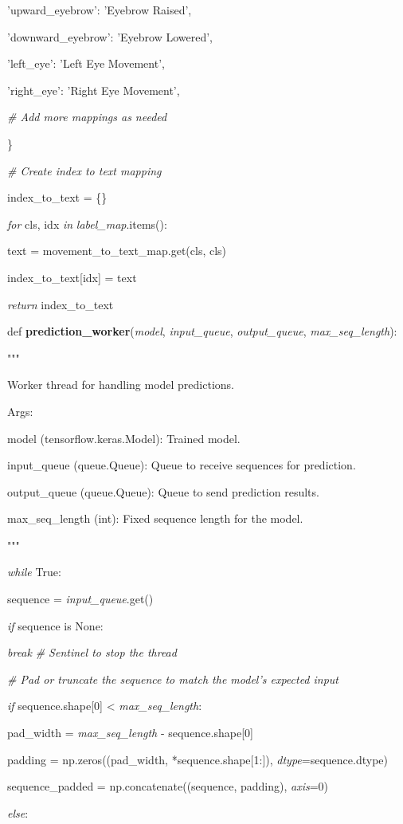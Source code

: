\documentclass[
]{article}
\begin{document}
'upward\_eyebrow': 'Eyebrow Raised',

'downward\_eyebrow': 'Eyebrow Lowered',

'left\_eye': 'Left Eye Movement',

'right\_eye': 'Right Eye Movement',

\emph{\# Add more mappings as needed}

\}

\emph{\# Create index to text mapping}

index\_to\_text = \{\}

\emph{for} cls, idx \emph{in} \emph{label\_map}.items():

text = movement\_to\_text\_map.get(cls, cls)

index\_to\_text{[}idx{]} = text

\emph{return} index\_to\_text

def \textbf{prediction\_worker}(\emph{model}, \emph{input\_queue}, \emph{output\_queue}, \emph{max\_seq\_length}):

"""

Worker thread for handling model predictions.

Args:

model (tensorflow.keras.Model): Trained model.

input\_queue (queue.Queue): Queue to receive sequences for prediction.

output\_queue (queue.Queue): Queue to send prediction results.

max\_seq\_length (int): Fixed sequence length for the model.

"""

\emph{while} True:

sequence = \emph{input\_queue}.get()

\emph{if} sequence is None:

\emph{break} \emph{\# Sentinel to stop the thread}

\emph{\# Pad or truncate the sequence to match the model's expected input}

\emph{if} sequence.shape{[}0{]} \textless{} \emph{max\_seq\_length}:

pad\_width = \emph{max\_seq\_length} - sequence.shape{[}0{]}

padding = np.zeros((pad\_width, *sequence.shape{[}1:{]}), \emph{dtype}=sequence.dtype)

sequence\_padded = np.concatenate((sequence, padding), \emph{axis}=0)

\emph{else}:
\end{document}
